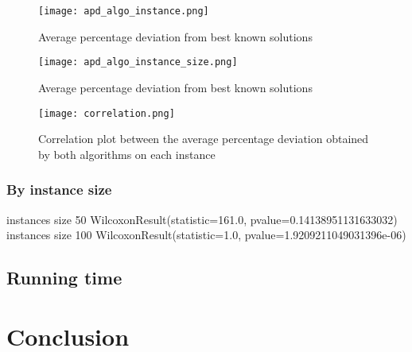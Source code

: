 \documentclass[a4paper,10pt]{article}
\begin{document}
\cite{main}

\begin{figure}[H]
	\centering
	\caption{Average percentage deviation from best known solutions}
	\texttt{[image: apd\_algo\_instance.png]}
\end{figure}


\begin{figure}[H]
	\centering
	\caption{Average percentage deviation from best known solutions}
	\texttt{[image: apd\_algo\_instance\_size.png]}
\end{figure}


\begin{figure}[H]
	\centering
	\caption{Correlation plot between the average percentage deviation obtained by both algorithms on each instance}
	\texttt{[image: correlation.png]}
\end{figure}



\subsubsection{By instance size}

instances size 50
WilcoxonResult(statistic=161.0, pvalue=0.14138951131633032)
instances size 100
WilcoxonResult(statistic=1.0, pvalue=1.9209211049031396e-06)

\subsection{Running time}

\section{Conclusion}




\end{document}
